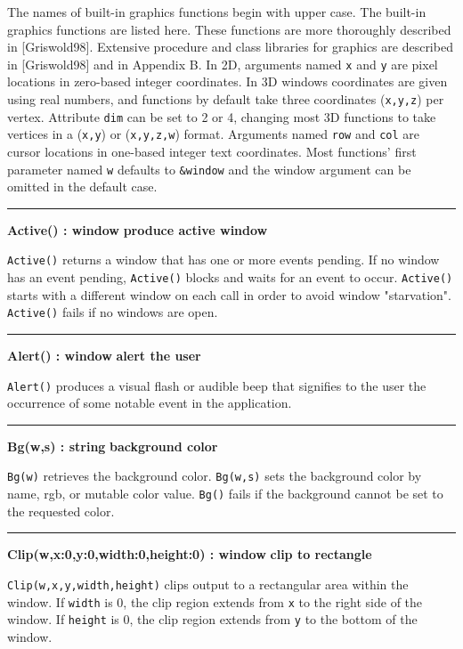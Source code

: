 The names of built-in graphics functions begin with upper case. The built-in
graphics functions are listed here. These functions are more thoroughly
described in [Griswold98]. Extensive procedure and class libraries for graphics
are described in [Griswold98] and in Appendix B.  In 2D, arguments named
\texttt{x} and \texttt{y} are pixel locations in zero-based integer
coordinates. In 3D windows coordinates are given using real numbers, and
functions by default take three coordinates (\texttt{x,y,z}) per
vertex. Attribute \texttt{dim} can be set to 2 or 4, changing most 3D functions
to take vertices in a (\texttt{x,y}) or (\texttt{x,y,z,w}) format. Arguments
named \texttt{row} and \texttt{col} are cursor locations in one-based integer
text coordinates. Most functions' first parameter named
\texttt{w} defaults to \texttt{\&window} and the window argument can be omitted
in the default case. 

\bigskip\hrule\vspace{0.1cm}
\noindent
{\bf Active() : window } \hfill {\bf produce active window}

\noindent
\texttt{Active()} returns a window that has one or more events pending.
If no window has an event pending, \texttt{Active()} blocks and waits
for an event to occur. \texttt{Active()} starts with a different
window on each call in order to avoid window
"starvation". \texttt{Active()} fails if
no windows are open.

\bigskip\hrule\vspace{0.1cm}
\noindent
{\bf Alert() : window } \hfill {\bf alert the user}

\noindent
\texttt{Alert()} produces a visual flash or audible beep that signifies
to the user the occurrence of some notable event in the application.

\bigskip\hrule\vspace{0.1cm}
\noindent
{\bf Bg(w,s) : string } \hfill {\bf background color}

\noindent
\texttt{Bg(w)} retrieves the background color. \texttt{Bg(w,s)} sets the
background color by name, rgb, or mutable color value. \texttt{Bg()}
fails if the background cannot be set to the requested color.

\bigskip\hrule\vspace{0.1cm}
\noindent
{\bf Clip(w,x:0,y:0,width:0,height:0) : window } \hfill {\bf clip to rectangle}

\noindent
\texttt{Clip(w,x,y,width,height)} clips output to a rectangular area
within the window. If \texttt{width} is 0, the clip region extends
from \texttt{x} to the right side of the window. If \texttt{height}
is 0, the clip region extends from \texttt{y} to the bottom of the
window.

